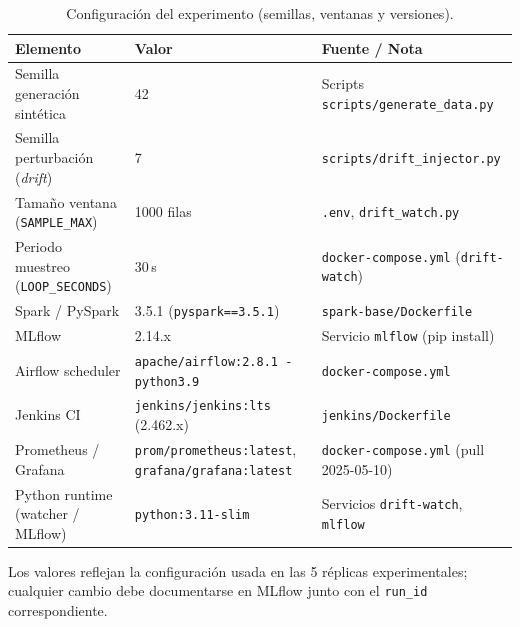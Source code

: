 \begin{table}[htbp]
\centering
\caption{Configuración del experimento (semillas, ventanas y versiones).}
\label{tab:exp-config}
\footnotesize
\setlength{\tabcolsep}{3pt}
\renewcommand{\arraystretch}{0.9}

\begin{tabular}{p{4cm} p{4cm} p{5.2cm}}
\toprule
\textbf{Elemento} & \textbf{Valor} & \textbf{Fuente / Nota} \\
\midrule

Semilla generación sintética &
42 &
Scripts \texttt{scripts/generate\_data.py} \\

Semilla perturbación (\textit{drift}) &
7 &
\texttt{scripts/drift\_injector.py} \\

Tamaño ventana (\texttt{SAMPLE\_MAX}) &
1000 filas &
\texttt{.env}, \texttt{drift\_watch.py} \\

Periodo muestreo (\texttt{LOOP\_SECONDS}) &
30\,s &
\texttt{docker-compose.yml} (\texttt{drift-watch}) \\

Spark / PySpark &
3.5.1 (\texttt{pyspark==3.5.1}) &
\texttt{spark-base/Dockerfile} \\

MLflow &
2.14.x &
Servicio \texttt{mlflow} (pip install) \\

Airflow scheduler &
\texttt{apache/airflow:2.8.1 - python3.9} &
\texttt{docker-compose.yml} \\

Jenkins CI &
\texttt{jenkins/jenkins:lts} (2.462.x) &
\texttt{jenkins/Dockerfile} \\

Prometheus / Grafana &
\texttt{prom/prometheus:latest}, \texttt{grafana/grafana:latest} &
\texttt{docker-compose.yml} (pull 2025-05-10) \\

Python runtime (watcher / MLflow) &
\texttt{python:3.11-slim} &
Servicios \texttt{drift-watch}, \texttt{mlflow} \\

\bottomrule
\end{tabular}

\vspace{3pt}
\footnotesize
Los valores reflejan la configuración usada en las 5 réplicas experimentales; cualquier cambio debe documentarse en MLflow junto con el \texttt{run\_id} correspondiente.
\end{table}



